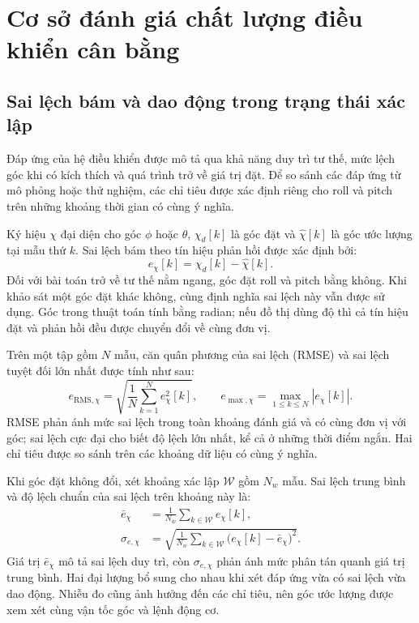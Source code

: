 \section{Cơ sở đánh giá chất lượng điều khiển cân bằng}
\label{sec:background-metrics}

\subsection{Sai lệch bám và dao động trong trạng thái xác lập}

Đáp ứng của hệ điều khiển được mô tả qua khả năng duy trì tư thế, mức lệch góc khi có kích thích và quá trình trở về giá trị đặt. Để so sánh các đáp ứng từ mô phỏng hoặc thử nghiệm, các chỉ tiêu được xác định riêng cho roll và pitch trên những khoảng thời gian có cùng ý nghĩa.

Ký hiệu $\chi$ đại diện cho góc $\phi$ hoặc $\theta$, $\chi_d[k]$ là góc đặt và $\hat\chi[k]$ là góc ước lượng tại mẫu thứ $k$. Sai lệch bám theo tín hiệu phản hồi được xác định bởi:
\begin{equation}
	e_\chi[k]=\chi_d[k]-\hat\chi[k].
	\label{eq:background-angle-error}
\end{equation}
Đối với bài toán trở về tư thế nằm ngang, góc đặt roll và pitch bằng không. Khi khảo sát một góc đặt khác không, cùng định nghĩa sai lệch này vẫn được sử dụng. Góc trong thuật toán tính bằng radian; nếu đồ thị dùng độ thì cả tín hiệu đặt và phản hồi đều được chuyển đổi về cùng đơn vị.

Trên một tập gồm $N$ mẫu, căn quân phương của sai lệch (RMSE) và sai lệch tuyệt đối lớn nhất được tính như sau:
\begin{equation}
	e_{\mathrm{RMS},\chi}=\sqrt{\frac{1}{N}\sum_{k=1}^{N}e_\chi^2[k]},
	\qquad e_{\max,\chi}=\max_{1\leq k\leq N}|e_\chi[k]|.
	\label{eq:background-error-indices}
\end{equation}
RMSE phản ánh mức sai lệch trong toàn khoảng đánh giá và có cùng đơn vị với góc; sai lệch cực đại cho biết độ lệch lớn nhất, kể cả ở những thời điểm ngắn. Hai chỉ tiêu được so sánh trên các khoảng dữ liệu có cùng ý nghĩa.

Khi góc đặt không đổi, xét khoảng xác lập $\mathcal W$ gồm $N_w$ mẫu. Sai lệch trung bình và độ lệch chuẩn của sai lệch trên khoảng này là:
\begin{equation}
	\begin{aligned}
		\bar e_\chi     & =\frac{1}{N_w}\sum_{k\in\mathcal W}e_\chi[k], \\
		\sigma_{e,\chi} & =\sqrt{\frac{1}{N_w}\sum_{k\in\mathcal W}
			\bigl(e_\chi[k]-\bar e_\chi\bigr)^2}.
	\end{aligned}
	\label{eq:background-steady-error}
\end{equation}
Giá trị $\bar e_\chi$ mô tả sai lệch duy trì, còn $\sigma_{e,\chi}$ phản ánh mức phân tán quanh giá trị trung bình. Hai đại lượng bổ sung cho nhau khi xét đáp ứng vừa có sai lệch vừa dao động. Nhiễu đo cũng ảnh hưởng đến các chỉ tiêu, nên góc ước lượng được xem xét cùng vận tốc góc và lệnh động cơ.


